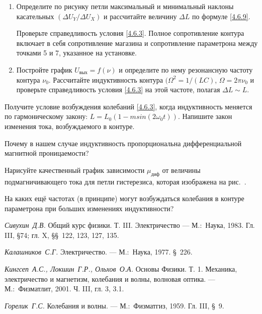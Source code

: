 \begin{lab:task}

\begin{enumerate}
\item
Определите по рисунку петли максимальный и минимальный наклоны касательных $(\Delta U_Y/ \Delta U_X)$ и рассчитайте величину $\Delta L$ по формуле \eqref{4.6.9}.

Проверьте справедливость условия \eqref{4.6.3}. Полное сопротивление контура включает в себя сопротивление магазина и сопротивление параметрона между точками 5 и 7, указанное на установке.

\item
Постройте график $U_\text{вых} = f(\nu)$ и определите по нему резонансную частоту контура $\nu_0$. Рассчитайте индуктивность контура $(\Omega^2 = 1/ (LC)$, $\Omega = 2\pi\nu_0$ и проверьте справедливость условия \eqref{4.6.3} на этой частоте, полагая $\Delta L \sim L$.
\end{enumerate}
\end{lab:task}

\begin{lab:questions}
\item
Получите условие возбуждения колебаний \eqref{4.6.3}, когда индуктивность меняется по гармоническому закону: $L = L_0(1-msin(2\omega_0t))$. Напишите закон изменения тока, возбуждаемого в контуре.

\item
Почему в нашем случае индуктивность пропорциональна дифференциальной магнитной проницаемости?

\item
Нарисуйте качественный график зависимости $\mu_\text{диф}$ от величины подмагничивающего тока для петли гистерезиса, которая изображена на рис.~.

\item
На каких ещё частотах (в принципе) могут возбуждаться колебания в контуре параметрона при больших изменениях индуктивности?
\end{lab:questions}

\begin{lab:literature}
\item
\emph{Сивухин~Д.В.} Общий курс физики. Т. III. Электричество --- М.:~Наука, 1983. Гл. III, \S 74; гл. X, \S\S~122, 123, 127, 135.

\item
\emph{Калашников~С.Г.} Электричество. --- М.:~Наука, 1977. \S~226.

\item
\emph{Кингсеп~А.С., Локшин~Г.Р., Ольхов~О.А.} Основы Физики. Т. 1. Механика, электричество и магнетизм, колебания и волны, волновая оптика. --- М.:~Физматлит, 2001. Ч. III, гл. 3, 3.1.

\item
\emph{Горелик~Г.С.} Колебания и волны. --- М.:~Физматгиз, 1959. Гл. III, \S~9.
\end{lab:literature}
